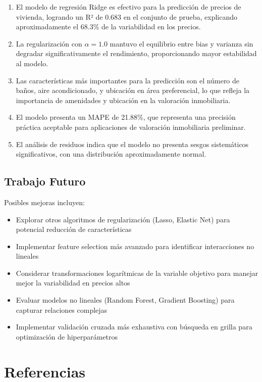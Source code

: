 \documentclass[11pt,a4paper]{article}
\begin{document}
\begin{enumerate}
    \item El modelo de regresión Ridge es efectivo para la predicción de precios de vivienda, logrando un R² de 0.683 en el conjunto de prueba, explicando aproximadamente el 68.3\% de la variabilidad en los precios.
    \item La regularización con $\alpha = 1.0$ mantuvo el equilibrio entre bias y varianza sin degradar significativamente el rendimiento, proporcionando mayor estabilidad al modelo.
    \item Las características más importantes para la predicción son el número de baños, aire acondicionado, y ubicación en área preferencial, lo que refleja la importancia de amenidades y ubicación en la valoración inmobiliaria.
    \item El modelo presenta un MAPE de 21.88\%, que representa una precisión práctica aceptable para aplicaciones de valoración inmobiliaria preliminar.
    \item El análisis de residuos indica que el modelo no presenta sesgos sistemáticos significativos, con una distribución aproximadamente normal.
\end{enumerate}

\subsection{Trabajo Futuro}

Posibles mejoras incluyen:
\begin{itemize}
    \item Explorar otros algoritmos de regularización (Lasso, Elastic Net) para potencial reducción de características
    \item Implementar feature selection más avanzado para identificar interacciones no lineales
    \item Considerar transformaciones logarítmicas de la variable objetivo para manejar mejor la variabilidad en precios altos
    \item Evaluar modelos no lineales (Random Forest, Gradient Boosting) para capturar relaciones complejas
    \item Implementar validación cruzada más exhaustiva con búsqueda en grilla para optimización de hiperparámetros
\end{itemize}

\section{Referencias}
\end{document}
